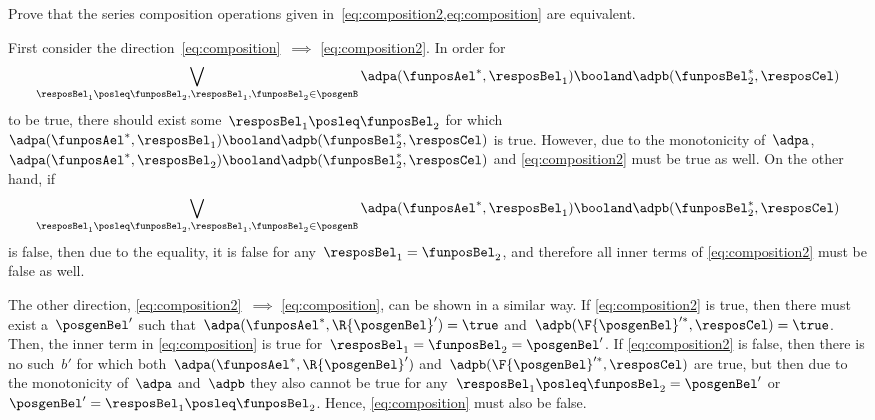\begin{exercise}
    \label{ex:composition_equivalency}
    Prove that the series composition operations given in~\cref{eq:composition2,eq:composition} are equivalent.
\end{exercise}
%
\begin{solution}
    First consider the direction~\cref{eq:composition}~$\implies$ \cref{eq:composition2}. In order for%
    \begin{equation*}
        \bigvee_{\resposBel_1\posleq\funposBel_2, \resposBel_1,\funposBel_2\in \posgenB} \adpa(\funposAel^*,\resposBel_1) \booland \adpb(\funposBel_2^*,\resposCel)%
    \end{equation*}
    to be true, there should exist some~$\resposBel_1\posleq \funposBel_2$ for which~$\adpa(\funposAel^*,\resposBel_1) \booland\adpb(\funposBel_2^*,\resposCel)$ is true.
    However, due to the monotonicity of~$\adpa$,~$\adpa(\funposAel^*,\resposBel_2) \booland \adpb(\funposBel_2^*,\resposCel)$ and \cref{eq:composition2} must be true as well.
    On the other hand, if%
    \begin{equation*}
        \bigvee_{\resposBel_1\posleq\funposBel_2, \resposBel_1,\funposBel_2\in \posgenB} \adpa(\funposAel^*,\resposBel_1) \booland \adpb(\funposBel_2^*,\resposCel)%
    \end{equation*}
    is false, then due to the equality, it is false for any~$\resposBel_1=\funposBel_2$, and therefore all inner terms of \cref{eq:composition2} must be false as well.

    The other direction, \cref{eq:composition2}~$\implies$ \cref{eq:composition}, can be shown in a similar way.
    If \cref{eq:composition2} is true, then there must exist a~$\posgenBel'$ such that~$\adpa(\funposAel^*, \R{\posgenBel}')=\true$ and~$\adpb(\F{\posgenBel}'^*, \resposCel)=\true$.
    Then, the inner term in \cref{eq:composition} is true for~$\resposBel_1=\funposBel_2=\posgenBel'$.
    If \cref{eq:composition2} is false, then there is no such~$b'$ for which both~$\adpa(\funposAel^*, \R{\posgenBel}')$ and~$\adpb(\F{\posgenBel}'^*, \resposCel)$ are true, but then due to the monotonicity of~$\adpa$ and~$\adpb$ they also cannot be true for any~$\resposBel_1 \posleq \funposBel_2 = \posgenBel'$ or~$\posgenBel'=\resposBel_1 \posleq \funposBel_2$.
    Hence, \cref{eq:composition} must also be false.
\end{solution}

